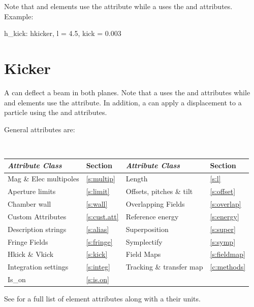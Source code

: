 Note that  and  elements use the
 attribute while a  uses the  and  
attributes. Example:
\begin{example}
  h_kick: hkicker, l = 4.5, kick = 0.003
\end{example}

\section{Kicker}
\label{s:kicker}

A  can deflect a beam in both planes. Note that a  uses the  and
 attributes while  and  elements use the  attribute.  In
addition, a  can apply a displacement to a particle using the  and
 attributes.

General  attributes are:
\begin{center}
\tt
\begin{tabular}{llll} \toprule
  {\sl Attribute Class}      & Section           & {\sl Attribute Class}      & Section          \\ \midrule
  Mag \& Elec multipoles     & \ref{s:multip}    & Length                     & \ref{s:l}        \\
  Aperture limits            & \ref{s:limit}     & Offsets, pitches \& tilt   & \ref{s:offset}   \\
  Chamber wall               & \ref{s:wall}      & Overlapping Fields         & \ref{s:overlap}  \\
  Custom Attributes          & \ref{s:cust.att}  & Reference energy           & \ref{s:energy}   \\ 
  Description strings        & \ref{s:alias}     & Superposition              & \ref{s:super}    \\
  Fringe Fields              & \ref{s:fringe}    & Symplectify                & \ref{s:symp}     \\
  Hkick \& Vkick             & \ref{s:kick}      & Field Maps                 & \ref{s:fieldmap} \\
  Integration settings       & \ref{s:integ}     & Tracking \& transfer map   & \ref{c:methods}  \\ 
  Is_on                      & \ref{s:is.on}     &                            &                  \\
  \bottomrule
\end{tabular}
\end{center}
\toffset
See  for a full list of element attributes along with a their units.

